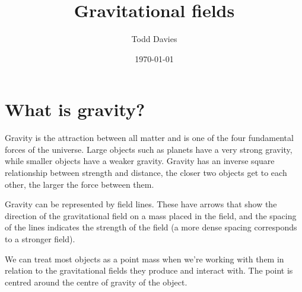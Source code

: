 \documentclass{article}
\title{Gravitational fields}
\author{Todd Davies}
\date{\today}
\begin{document}
\lhead{\today}
\setlength{\parindent}{0cm}

\maketitle

\section*{What is gravity?}
\thispagestyle{empty}
Gravity is the attraction between all matter and is one of the four fundamental forces of the universe. Large objects such as planets have a very strong gravity, while smaller objects have a weaker gravity. Gravity has an inverse square relationship between strength and distance, the closer two objects get to each other, the larger the force between them.

Gravity can be represented by field lines. These have arrows that show the direction of the gravitational field on a mass placed in the field, and the spacing of the lines indicates the strength of the field (a more dense spacing corresponds to a stronger field).

We can treat most objects as a point mass when we're working with them in relation to the gravitational fields they produce and interact with. The point is centred around the centre of gravity of the object.
\end{document}
